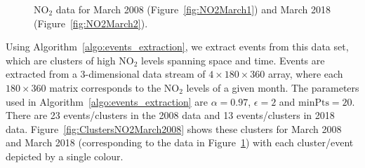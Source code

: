 \documentclass[a4paper,11pt]{article}
\begin{document}
\begin{figure}[!htb]
	\centering
	\caption{$\text{NO}_2$ data for March 2008 (Figure~\ref{fig:NO2March1})  and March 2018 (Figure~\ref{fig:NO2March2}). }
	\label{fig:NO2March2008}
\end{figure}

Using Algorithm~\ref{algo:events_extraction}, we extract events from this data set, which are clusters of high $\text{NO}_2$ levels spanning space and time. Events are extracted from a 3-dimensional data stream of $4 \times 180 \times 360$ array, where each $180 \times 360$ matrix corresponds to the $\text{NO}_2$ levels of a given month. The parameters used in Algorithm~\ref{algo:events_extraction} are $\alpha = 0.97$, $\epsilon=2$ and $\text{minPts} = 20$. There are 23 events/clusters in the 2008 data and 13 events/clusters in 2018 data. Figure~\ref{fig:ClustersNO2March2008} shows these clusters for March 2008 and March 2018 (corresponding to the data in Figure~\ref{fig:NO2March2008}) with each cluster/event depicted by a single colour.
\end{document}
